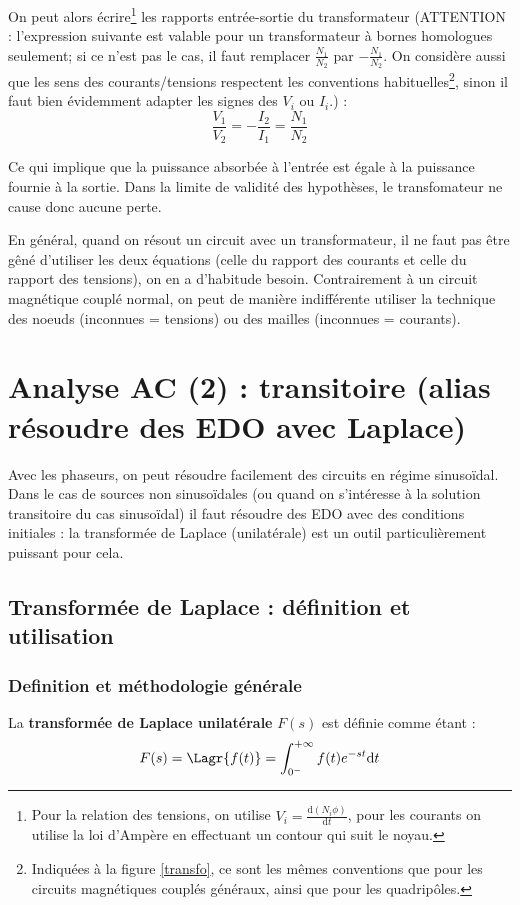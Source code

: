On peut alors écrire\footnote{Pour la relation des tensions, on utilise $V_i = \frac{\mathrm{d}(N_i \phi)}{\mathrm{d}t}$, pour les courants on utilise la loi d'Ampère en effectuant un contour qui suit le noyau.} les rapports entrée-sortie du transformateur (ATTENTION : l'expression suivante est valable pour un transformateur à bornes homologues seulement; si ce n'est pas le cas, il faut remplacer $\frac{N_1}{N_2}$ par $-\frac{N_1}{N_2}$. On considère aussi que les sens des courants/tensions respectent les conventions habituelles\footnote{Indiquées à la figure \ref{transfo}, ce sont les mêmes conventions que pour les circuits magnétiques couplés généraux, ainsi que pour les quadripôles.}, sinon il faut bien évidemment adapter les signes des $V_i$ ou $I_i$.) :
\begin{equation}
\frac{V_1}{V_2} = - \frac{I_2}{I_1} = \frac{N_1}{N_2}
\end{equation}

Ce qui implique que la puissance absorbée à l'entrée est égale à la puissance fournie à la sortie. Dans la limite de validité des hypothèses, le transfomateur ne cause donc aucune perte.

En général, quand on résout un circuit avec un transformateur, il ne faut pas être gêné d'utiliser les deux équations (celle du rapport des courants et celle du rapport des tensions), on en a d'habitude besoin. Contrairement à un circuit magnétique couplé normal, on peut de manière indifférente utiliser la technique des noeuds (inconnues = tensions) ou des mailles (inconnues = courants).
\section{Analyse AC (2) : transitoire (alias résoudre des EDO avec Laplace)}
Avec les phaseurs, on peut résoudre facilement des circuits en régime sinusoïdal. Dans le cas de sources non sinusoïdales (ou quand on s'intéresse à la solution transitoire du cas sinusoïdal) il faut résoudre des EDO avec des conditions initiales : la transformée de Laplace (unilatérale) est un outil particulièrement puissant pour cela.
\subsection{Transformée de Laplace : définition et utilisation}
\subsubsection*{Definition et méthodologie générale}
La \textbf{transformée de Laplace unilatérale} $F(s)$ est définie comme étant :
\begin{equation}
F(s) = \Lagr\{f(t)\} = \int_{0^-}^{+ \infty} f(t) e^{-st} \mathrm{d}t
\end{equation}

